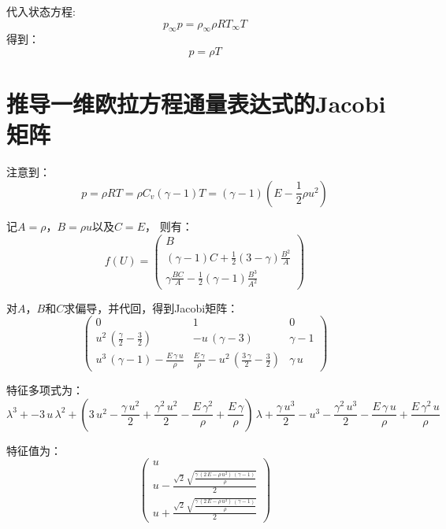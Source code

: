 \documentclass[12pt, a4paper]{article}
\begin{document}
代入状态方程:
    \begin{equation}
        p_{\infty}p = \rho_{\infty}\rho R T_{\infty}T
    \end{equation}
得到：
    \begin{equation}
        p = \rho T
    \end{equation}

\section{推导一维欧拉方程通量表达式的Jacobi矩阵}
注意到：
    \begin{equation}
        p = \rho R T = \rho C_{v}(\gamma - 1)T = (\gamma - 1)(E - \frac{1}{2}\rho u^2)
    \end{equation}

记$A = \rho$，$B = \rho u$以及$C = E$， 则有：
    \begin{equation}
        f(U) = 
        \left(
            \begin{array}{ccc} 
                B\\ 
                (\gamma-1)C + \frac{1}{2}(3-\gamma)\frac{B^2}{A}\\ 
                \gamma\frac{BC}{A}-\frac{1}{2}(\gamma - 1)\frac{B^3}{A^2}
            \end{array}
        \right)
    \end{equation}

    对$A$，$B$和$C$求偏导，并代回，得到Jacobi矩阵：
    \begin{equation}
        \left(
            \begin{array}{ccc} 
                0 & 1 & 0\\ 
                u^2\,\left(\frac{\gamma }{2}-\frac{3}{2}\right) & -u\,\left(\gamma -3\right) & \gamma -1\\ 
                u^3\,\left(\gamma -1\right)-\frac{E\,\gamma \,u}{\rho } & \frac{E\,\gamma }{\rho }-u^2\,\left(\frac{3\,\gamma }{2}-\frac{3}{2}\right) & \gamma \,u 
            \end{array}
        \right)
    \end{equation}
    
    特征多项式为：
    \begin{equation}
        \lambda ^3+-3\,u\,\lambda ^2+\left(3\,u^2-\frac{\gamma \,u^2}{2}+\frac{\gamma ^2\,u^2}{2}-\frac{E\,\gamma ^2}{\rho }+\frac{E\,\gamma }{\rho }\right)\,\lambda +\frac{\gamma \,u^3}{2}-u^3-\frac{\gamma ^2\,u^3}{2}-\frac{E\,\gamma \,u}{\rho }+\frac{E\,\gamma ^2\,u}{\rho }
    \end{equation}

    特征值为：
    \begin{equation}
        \left(
            \begin{array}{c} 
                u\\ 
                u-\frac{\sqrt{2}\,\sqrt{\frac{\gamma \,\left(2\,E-\rho \,u^2\right)\,\left(\gamma -1\right)}{\rho }}}{2}\\ 
                u+\frac{\sqrt{2}\,\sqrt{\frac{\gamma \,\left(2\,E-\rho \,u^2\right)\,\left(\gamma -1\right)}{\rho }}}{2} 
            \end{array}
        \right)
    \end{equation}
\end{document}
